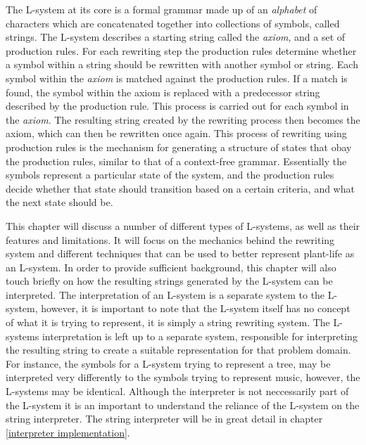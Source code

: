 
\lettrine[lines=3]{T}{}he L-system at its core is a formal grammar made up of an \textit{alphabet} of characters which are concatenated together into collections of symbols, called strings. The L-system describes a starting string called the \textit{axiom}, and a set of production rules. For each rewriting step the production rules determine whether a symbol within a string should be rewritten with another symbol or string. Each symbol within the \textit{axiom} is matched against the production rules. If a match is found, the symbol within the axiom is replaced with a predecessor string described by the production rule. This process is carried out for each symbol in the \textit{axiom}. The resulting string created by the rewriting process then becomes the axiom, which can then be rewritten once again. This process of rewriting using production rules is the mechanism for generating a structure of states that obay the production rules, similar to that of a context-free grammar. Essentially the symbols represent a particular state of the system, and the production rules decide whether that state should transition based on a certain criteria, and what the next state should be. 

This chapter will discuss a number of different types of L-systems, as well as their features and limitations. It will focus on the mechanics behind the rewriting system and different techniques that can be used to better represent plant-life as an L-system. In order to provide sufficient background, this chapter will also touch briefly on how the resulting strings generated by the L-system can be interpreted. The interpretation of an L-system is a separate system to the L-system, however, it is important to note that the L-system itself has no concept of what it is trying to represent, it is simply a string rewriting system. The L-systems interpretation is left up to a separate system, responsible for interpreting the resulting string to create a suitable representation for that problem domain. For instance, the symbols for a L-system trying to represent a tree, may be interpreted very differently to the symbols trying to represent music, however, the L-systems may be identical. Although the interpreter is not neccessarily part of the L-system it is an important to understand the reliance of the L-system on the string interpreter. The string interpreter will be in great detail in chapter \ref{interpreter implementation}.


